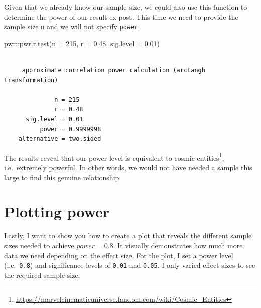 \documentclass[
  letterpaper,
]{krantz}
\makeatletter
\newenvironment{Shaded}{\begin{snugshade}}{\end{snugshade}}
\newcommand{\AttributeTok}[1]{\textcolor[rgb]{0.40,0.45,0.13}{#1}}
\newcommand{\DecValTok}[1]{\textcolor[rgb]{0.68,0.00,0.00}{#1}}
\newcommand{\FloatTok}[1]{\textcolor[rgb]{0.68,0.00,0.00}{#1}}
\newcommand{\FunctionTok}[1]{\textcolor[rgb]{0.28,0.35,0.67}{#1}}
\newcommand{\NormalTok}[1]{\textcolor[rgb]{0.00,0.23,0.31}{#1}}
\newcommand{\SpecialCharTok}[1]{\textcolor[rgb]{0.37,0.37,0.37}{#1}}
\renewcommand{\href}[2]{#2\footnote{\url{#1}}}
\newenvironment{kframe}{%
\medskip{}
\setlength{\fboxsep}{.8em}
 \def\at@end@of@kframe{}%
 \ifinner\ifhmode%
  \def\at@end@of@kframe{\end{minipage}}%
  \begin{minipage}{\columnwidth}%
 \fi\fi%
 \def\FrameCommand##1{\hskip\@totalleftmargin \hskip-\fboxsep
 \colorbox{shadecolor}{##1}\hskip-\fboxsep
     \hskip-\linewidth \hskip-\@totalleftmargin \hskip\columnwidth}%
 \MakeFramed {\advance\hsize-\width
   \@totalleftmargin\z@ \linewidth\hsize
   \@setminipage}}%
 {\par\unskip\endMakeFramed%
 \at@end@of@kframe}
\renewenvironment{Shaded}{\begin{kframe}}{\end{kframe}}
\makeatother
\begin{document}
Given that we already know our sample size, we could also use this
function to determine the power of our result ex-post. This time we need
to provide the sample size \texttt{n} and we will not specify
\texttt{power}.

\begin{Shaded}
\begin{Highlighting}[]
\NormalTok{pwr}\SpecialCharTok{::}\FunctionTok{pwr.r.test}\NormalTok{(}\AttributeTok{n =} \DecValTok{215}\NormalTok{,}
                \AttributeTok{r =} \FloatTok{0.48}\NormalTok{,}
                \AttributeTok{sig.level =} \FloatTok{0.01}\NormalTok{)}
\end{Highlighting}
\end{Shaded}

\begin{verbatim}

     approximate correlation power calculation (arctangh transformation) 

              n = 215
              r = 0.48
      sig.level = 0.01
          power = 0.9999998
    alternative = two.sided
\end{verbatim}

The results reveal that our power level is equivalent to
\href{https://marvelcinematicuniverse.fandom.com/wiki/Cosmic_Entities}{cosmic
entities}, i.e.~extremely powerful. In other words, we would not have
needed a sample this large to find this genuine relationship.

\section{Plotting power}\label{sec-plotting-power}

Lastly, I want to show you how to create a plot that reveals the
different sample sizes needed to achieve \(power = 0.8\). It visually
demonstrates how much more data we need depending on the effect size.
For the plot, I set a power level (i.e.~\texttt{0.8}) and significance
levels of \texttt{0.01} and \texttt{0.05}. I only varied effect sizes to
see the required sample size.
\end{document}
